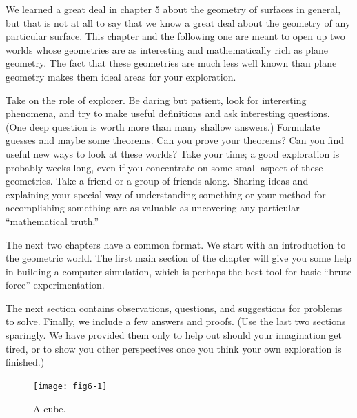 \documentclass{book}
\begin{document}
We learned a great deal in chapter 5 about the geometry of surfaces in
general, but that is not at all to say that we know a great deal about the
geometry of any particular surface. This chapter and the following one
are meant to open up two worlds whose geometries are as interesting and
mathematically rich as plane geometry. The fact that these geometries
are much less well known than plane geometry makes them ideal areas
for your exploration.

Take on the role of explorer. Be daring but patient, look for interesting phenomena, and try to make useful definitions and ask interesting questions. (One deep question is worth more than many shallow
answers.) Formulate guesses and maybe some theorems. Can you prove
your theorems? Can you find useful new ways to look at these worlds?
Take your time; a good exploration is probably weeks long, even if you
concentrate on some small aspect of these geometries. Take a friend or a
group of friends along. Sharing ideas and explaining your special way of
understanding something or your method for accomplishing something
are as valuable as uncovering any particular ``mathematical truth.''

The next two chapters have a common format. We start with an
introduction to the geometric world. The first main section of the
chapter will give you some help in building a computer simulation,
which is perhaps the best tool for basic ``brute force'' experimentation.

The next section contains observations, questions, and suggestions for
problems to solve. Finally, we include a few answers and proofs. (Use
the last two sections sparingly. We have provided them only to help
out should your imagination get tired, or to show you other perspectives
once you think your own exploration is finished.)

\begin{figure}
\begin{center}
\texttt{[image: fig6-1]}
\caption{A cube.}
\end{center}
\end{figure}
\end{document}
